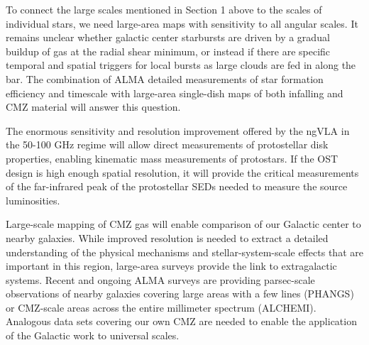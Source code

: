 \documentclass[modern]{aastex62}
\begin{document}
To connect the large scales mentioned in Section 1 above to the scales of individual stars,
we need large-area maps with sensitivity to all angular scales.  It remains unclear whether
galactic center starbursts are driven by a gradual buildup of gas at the radial shear minimum,
or instead if there are specific temporal and spatial triggers for local bursts as large clouds are fed
in along the bar.  The combination of ALMA detailed measurements of star formation efficiency and timescale
with large-area single-dish maps of both infalling and CMZ material will answer this question.

The enormous sensitivity and resolution improvement offered by the ngVLA in the
50-100 GHz regime will allow direct measurements of protostellar disk
properties, enabling kinematic mass
measurements of protostars. %
If the OST design is high enough spatial resolution, it will provide the critical measurements
of the far-infrared peak of the protostellar SEDs needed to measure the source luminosities.


Large-scale mapping of CMZ gas will enable comparison of our Galactic center to
nearby galaxies.  While improved resolution is needed to extract a detailed
understanding of the physical mechanisms and stellar-system-scale effects that
are important in this region, large-area surveys provide the link to
extragalactic systems.  Recent and ongoing ALMA surveys are providing
parsec-scale observations of nearby galaxies covering large areas with a few
lines (PHANGS) or CMZ-scale areas across the entire millimeter spectrum
(ALCHEMI).  Analogous data sets covering our own CMZ are needed to enable
the application of the Galactic work to universal scales.



\end{document}
